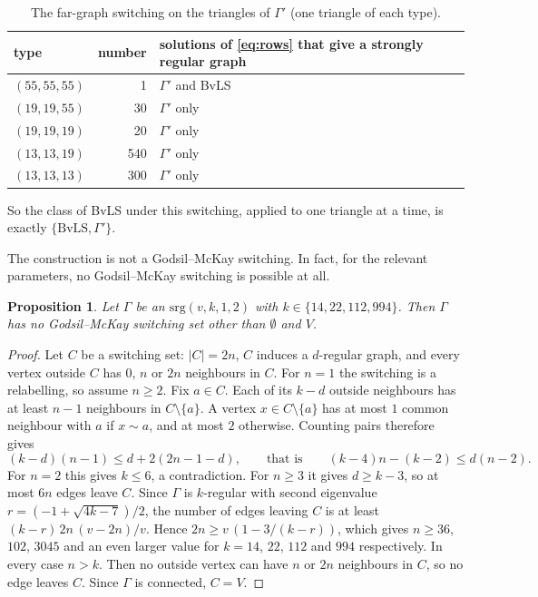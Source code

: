 \documentclass[11pt]{amsart}
\newtheorem{proposition}[theorem]{Proposition}
\theoremstyle{remark}
\begin{document}
\begin{table}[ht]
\centering
\caption{The far-graph switching on the triangles of $\Gamma'$ (one triangle of each type).}
\label{tab:types}
\begin{tabular}{lrl}
\toprule
type & number & solutions of \eqref{eq:rows} that give a strongly regular graph\\
\midrule
$(55,55,55)$ & 1 & $\Gamma'$ and BvLS\\
$(19,19,55)$ & 30 & $\Gamma'$ only\\
$(19,19,19)$ & 20 & $\Gamma'$ only\\
$(13,13,19)$ & 540 & $\Gamma'$ only\\
$(13,13,13)$ & 300 & $\Gamma'$ only\\
\bottomrule
\end{tabular}
\end{table}

So the class of BvLS under this switching, applied to one triangle at a time, is exactly $\{\mathrm{BvLS},\Gamma'\}$.

The construction is not a Godsil--McKay switching. In fact, for the relevant parameters, no Godsil--McKay switching is
possible at all.

\begin{proposition}\label{prop:gm}
Let $\Gamma$ be an $\mathrm{srg}(v,k,1,2)$ with $k\in\{14,22,112,994\}$. Then $\Gamma$ has no Godsil--McKay switching set
other than $\emptyset$ and $V$.
\end{proposition}
\begin{proof}
Let $C$ be a switching set: $|C|=2n$, $C$ induces a $d$-regular graph, and every vertex outside $C$ has $0$, $n$ or $2n$
neighbours in $C$. For $n=1$ the switching is a relabelling, so assume $n\ge2$. Fix $a\in C$. Each of its $k-d$ outside
neighbours has at least $n-1$ neighbours in $C\setminus\{a\}$. A vertex $x\in C\setminus\{a\}$ has at most $1$ common
neighbour with $a$ if $x\sim a$, and at most $2$ otherwise. Counting pairs therefore gives
\[
(k-d)(n-1)\le d+2(2n-1-d),\qquad\text{that is}\qquad (k-4)n-(k-2)\le d(n-2).
\]
For $n=2$ this gives $k\le6$, a contradiction. For $n\ge3$ it gives $d\ge k-3$, so at most $6n$ edges leave $C$. Since
$\Gamma$ is $k$-regular with second eigenvalue $r=(-1+\sqrt{4k-7})/2$, the number of edges leaving $C$ is at least
$(k-r)\,2n\,(v-2n)/v$. Hence $2n\ge v\,(1-3/(k-r))$, which gives $n\ge36$, $102$, $3045$ and an even larger value for
$k=14$, $22$, $112$ and $994$ respectively. In every case $n>k$. Then no outside vertex can have $n$ or $2n$ neighbours in
$C$, so no edge leaves $C$. Since $\Gamma$ is connected, $C=V$.
\end{proof}
\end{document}
